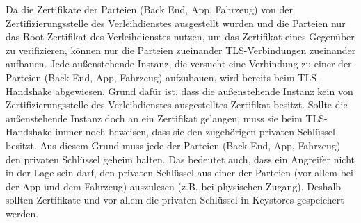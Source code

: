 Da die Zertifikate der Parteien (Back End, App, Fahrzeug) von der Zertifizierungsstelle des Verleihdienstes ausgestellt wurden und die Parteien nur das Root-Zertifikat des Verleihdienstes nutzen, um das Zertifikat eines Gegenüber zu verifizieren, können nur die Parteien zueinander TLS-Verbindungen zueinander aufbauen. Jede außenstehende Instanz, die versucht eine Verbindung zu einer der Parteien (Back End, App, Fahrzeug) aufzubauen, wird bereits beim TLS-Handshake abgewiesen. Grund dafür ist, dass die außenstehende Instanz kein von Zertifizierungsstelle des Verleihdienstes ausgestelltes Zertifikat besitzt. Sollte die außenstehende Instanz doch an ein Zertifikat gelangen, muss sie beim TLS-Handshake immer noch beweisen, dass sie den zugehörigen privaten Schlüssel besitzt. Aus diesem Grund muss jede der Parteien (Back End, App, Fahrzeug) den privaten Schlüssel geheim halten. Das bedeutet auch, dass ein Angreifer nicht in der Lage sein darf, den privaten Schlüssel aus einer der Parteien (vor allem bei der App und dem Fahrzeug) auszulesen (z.B. bei physischen Zugang). Deshalb sollten Zertifikate und vor allem die privaten Schlüssel in Keystores gespeichert werden.